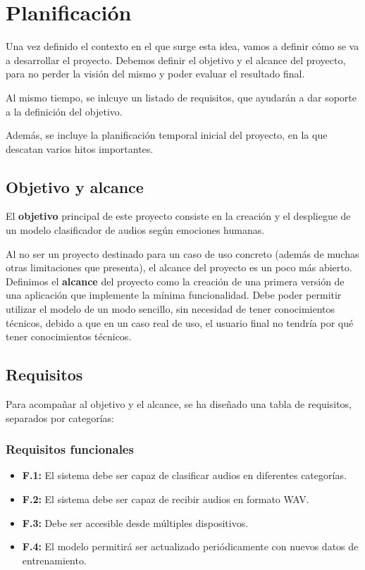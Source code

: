 \section{Planificación}\label{sec:planificacion}

Una vez definido el contexto en el que surge esta idea, vamos a definir cómo se va a desarrollar el proyecto.
Debemos definir el objetivo y el alcance del proyecto, para no perder la visión del mismo y poder evaluar el resultado final.

Al mismo tiempo, se inlcuye un listado de requisitos, que ayudarán a dar soporte a la definición del objetivo.

Además, se incluye la planificación temporal inicial del proyecto, en la que descatan varios hitos importantes.


\subsection{Objetivo y alcance}\label{sec:objetivo}
El \textbf{objetivo} principal de este proyecto consiste en la creación y el despliegue de un modelo clasificador de audios según emociones humanas.

Al no ser un proyecto destinado para un caso de uso concreto (además de muchas otras limitaciones que presenta), el alcance del proyecto es un poco más abierto.
Definimos el \textbf{alcance} del proyecto como la creación de una primera versión de una aplicación que implemente la mínima funcionalidad.
Debe poder permitir utilizar el modelo de un modo sencillo, sin necesidad de tener conocimientos técnicos, debido a que en un caso real de uso, el usuario final no tendría por qué tener conocimientos técnicos.


\subsection{Requisitos}\label{sec:requisitos}

Para acompañar al objetivo y el alcance, se ha diseñado una tabla de requisitos, separados por categorías:

\subsubsection{Requisitos funcionales}\label{sec:requisitos-funcionales}
\begin{itemize}\itemsep1pt \parskip0pt 
    \item \textbf{F.1:} El sistema debe ser capaz de clasificar audios en diferentes categorías.
    \item \textbf{F.2:} El sistema debe ser capaz de recibir audios en formato WAV.
    \item \textbf{F.3:} Debe ser accesible desde múltiples dispositivos.
    \item \textbf{F.4:} El modelo permitirá ser actualizado periódicamente con nuevos datos de entrenamiento.
\end{itemize}

